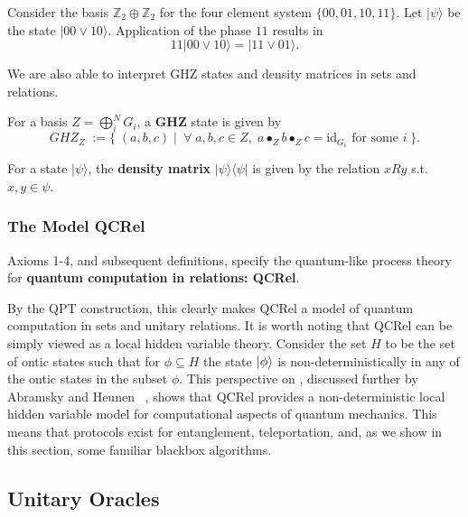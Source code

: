 \begin{example}
Consider the basis $\mathbb{Z}_2\oplus\mathbb{Z}_2$ for the four element system $\{00,01,10,11\}$.  Let $|\psi\rangle$ be the state $|00\vee10\rangle$. Application of the phase $11$ results in
\[ 11|00\vee10\rangle = |11\vee01\rangle . \]
\end{example}

We are also able to interpret GHZ states and density matrices in sets and relations.

\begin{defn}
For a basis $Z=\bigoplus_i^NG_i$, a \textbf{GHZ} state is given by
\[ GHZ_Z \; := \{\;(a,b,c)\;|\;\ \forall \;a,b,c \in Z,\;a\bullet_Zb\bullet_Zc = \mbox{id}_{G_i}\mbox{ for some } i\;\}.  \]
\end{defn}

\begin{defn}
For a state $|\psi\rangle$, the \textbf{density matrix} $|\psi\rangle\langle\psi|$ is given by the relation $xRy$ s.t. $x,y\in \psi$.
\end{defn}

\subsubsection*{The Model QCRel}

\begin{defn}
Axioms 1-4, and subsequent definitions, specify the quantum-like process theory for \textbf{quantum computation in relations: QCRel}.
\end{defn}

By the QPT construction, this clearly makes QCRel a model of quantum computation in sets and unitary relations. It is worth noting that QCRel can be simply viewed as a local hidden variable theory. Consider the set $H$ to be the set of ontic states such that for $\phi\subseteq H$ the state $| \phi \rangle$ is non-deterministically in any of the ontic states in the subset $\phi$.  This perspective on , discussed further by Abramsky and Heunen~ \cite{abramsky2012operational}, shows that QCRel provides a non-deterministic local hidden variable model for computational aspects of quantum mechanics. This means that protocols exist for entanglement, teleportation, and, as we show in this section, some familiar blackbox algorithms.

\subsection{Unitary Oracles}

